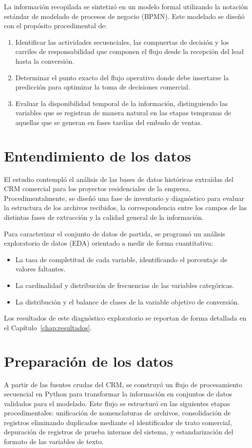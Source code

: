 La información recopilada se sintetizó en un modelo formal utilizando la notación estándar de modelado de procesos de negocio (BPMN). Este modelado se diseñó con el propósito procedimental de:
\begin{enumerate}
    \item Identificar las actividades secuenciales, las compuertas de decisión y los carriles de responsabilidad que componen el flujo desde la recepción del lead hasta la conversión.
    \item Determinar el punto exacto del flujo operativo donde debe insertarse la predicción para optimizar la toma de decisiones comercial.
    \item Evaluar la disponibilidad temporal de la información, distinguiendo las variables que se registran de manera natural en las etapas tempranas de aquellas que se generan en fases tardías del embudo de ventas.
\end{enumerate}

\section{Entendimiento de los datos}
El estudio contempló el análisis de las bases de datos históricas extraídas del CRM comercial para los proyectos residenciales de la empresa. Procedimentalmente, se diseñó una fase de inventario y diagnóstico para evaluar la estructura de los archivos recibidos, la correspondencia entre los campos de las distintas fases de extracción y la calidad general de la información.

Para caracterizar el conjunto de datos de partida, se programó un análisis exploratorio de datos (EDA) orientado a medir de forma cuantitativa:
\begin{itemize}
    \item La tasa de completitud de cada variable, identificando el porcentaje de valores faltantes.
    \item La cardinalidad y distribución de frecuencias de las variables categóricas.
    \item La distribución y el balance de clases de la variable objetivo de conversión.
\end{itemize}
Los resultados de este diagnóstico exploratorio se reportan de forma detallada en el Capítulo~\ref{chap:resultados}.

\section{Preparación de los datos}
A partir de las fuentes crudas del CRM, se construyó un flujo de procesamiento secuencial en Python para transformar la información en conjuntos de datos validados para el modelado. Este flujo se estructuró en las siguientes etapas procedimentales: unificación de nomenclaturas de archivos, consolidación de registros eliminando duplicados mediante el identificador de trato comercial, depuración de registros de prueba internos del sistema, y estandarización del formato de las variables de texto.

